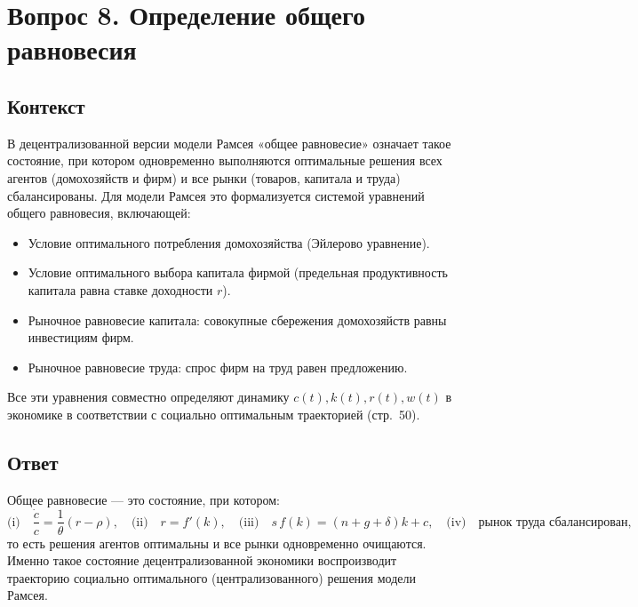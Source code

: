 \section*{Вопрос 8. Определение общего равновесия}

\subsection*{Контекст}
В децентрализованной версии модели Рамсея «общее равновесие» означает такое состояние, при котором одновременно выполняются 
оптимальные решения всех агентов (домохозяйств и фирм) и все рынки (товаров, капитала и труда) сбалансированы. Для модели 
Рамсея это формализуется системой уравнений общего равновесия, включающей:  
\begin{itemize}
  \item Условие оптимального потребления домохозяйства (Эйлерово уравнение).
  \item Условие оптимального выбора капитала фирмой (предельная продуктивность капитала равна ставке доходности \(r\)).
  \item Рыночное равновесие капитала: совокупные сбережения домохозяйств равны инвестициям фирм.
  \item Рыночное равновесие труда: спрос фирм на труд равен предложению.
\end{itemize}
Все эти уравнения совместно определяют динамику \(c(t),k(t),r(t),w(t)\) в экономике в соответствии с социально оптимальным траекторией 
(стр.~50).

\subsection*{Ответ}
Общее равновесие — это состояние, при котором:
\[
\text{(i)}\quad \frac{\dot c}{c}=\frac{1}{\theta}(r-\rho),
\quad
\text{(ii)}\quad r=f'(k),
\quad
\text{(iii)}\quad s\,f(k)=(n+g+\delta)k+c,
\quad
\text{(iv)}\quad \text{рынок труда сбалансирован},
\]
то есть решения агентов оптимальны и все рынки одновременно очищаются. Именно такое состояние 
децентрализованной экономики воспроизводит траекторию социально оптимального (централизованного) решения модели Рамсея.
